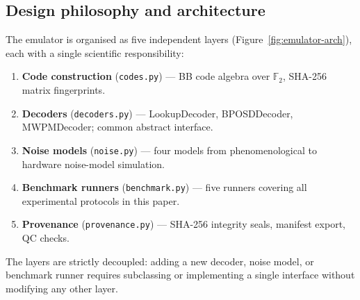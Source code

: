\documentclass[11pt,a4paper]{article}
\begin{document}
\subsection{Design philosophy and architecture}

The emulator is organised as five independent layers
(Figure~\ref{fig:emulator-arch}), each with a single scientific
responsibility:

\begin{enumerate}[leftmargin=1.6em,label=\textbf{L\arabic*.}]
  \item \textbf{Code construction} (\texttt{codes.py}) ---
    BB code algebra over $\mathbb{F}_2$, SHA-256 matrix fingerprints.
  \item \textbf{Decoders} (\texttt{decoders.py}) ---
    LookupDecoder, BPOSDDecoder, MWPMDecoder; common abstract interface.
  \item \textbf{Noise models} (\texttt{noise.py}) ---
    four models from phenomenological to hardware noise-model simulation.
  \item \textbf{Benchmark runners} (\texttt{benchmark.py}) ---
    five runners covering all experimental protocols in this paper.
  \item \textbf{Provenance} (\texttt{provenance.py}) ---
    SHA-256 integrity seals, manifest export, QC checks.
\end{enumerate}

The layers are strictly decoupled: adding a new decoder, noise model,
or benchmark runner requires subclassing or implementing a single
interface without modifying any other layer.
\end{document}
